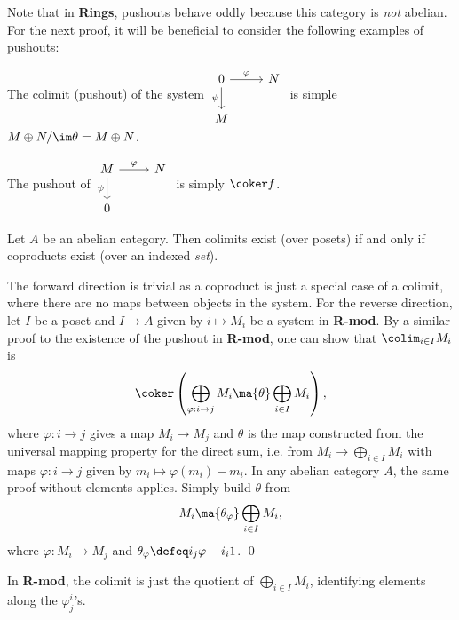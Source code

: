 Note that in \textbf{Rings}, pushouts behave oddly because this category is \emph{not} abelian. For the next proof, it will be beneficial to consider the following examples of pushouts:


\begin{ex}
The colimit (pushout) of the system $\begin{tikzcd} 0 \arrow{r}{\varphi} \arrow[swap]{d}{\psi} & N \\ M & \end{tikzcd}$ is simple $M \oplus N/\im \theta=M \oplus N$. \xqed
\end{ex}


\begin{ex}
The pushout of $\begin{tikzcd} M \arrow{r}{\varphi} \arrow[swap]{d}{\psi} & N \\ 0 & \end{tikzcd}$ is simply $\coker f$. \xqed
\end{ex}


\begin{prop}
Let $A$ be an abelian category. Then colimits exist (over posets) if and only if coproducts exist (over an indexed \emph{set}).
\end{prop}

\pf The forward direction is trivial as a coproduct is just a special case of a colimit, where there are no maps between objects in the system. For the reverse direction, let $I$ be a poset and $I \to A$ given by $i \mapsto M_i$ be a system in \textbf{R-mod}. By a similar proof to the existence of the pushout in \textbf{R-mod}, one can show that $\colim_{i \in I} M_i$ is 
	\[
	\coker \left( \bigoplus_{\varphi: i \to j} M_i \ma{\theta} \bigoplus_{i \in I} M_i \right),
	\]
where $\varphi: i \to j$ gives a map $M_i \to M_j$ and $\theta$ is the map constructed from the universal mapping property for the direct sum, i.e. from $M_i \to \bigoplus_{i \in I} M_i$ with maps $\varphi: i \to j$ given by $m_i \mapsto \varphi(m_i)-m_i$. In any abelian category $A$, the same proof without elements applies. Simply build $\theta$ from 
	\[
	M_i \ma{\theta_\varphi} \bigoplus_{i \in I} M_i,
	\]
where $\varphi: M_i \to M_j$ and $\theta_\varphi \defeq i_j \varphi - i_i 1$. \qed \\


\begin{rem}
In \textbf{R-mod}, the colimit is just the quotient of $\bigoplus_{i \in I} M_i$, identifying elements along the $\varphi_j^i$'s. 
\end{rem}


